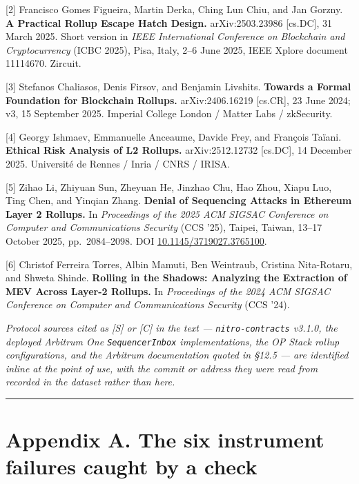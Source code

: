 \documentclass[conference]{IEEEtran}
\renewcommand{\_}{\textunderscore\allowbreak}
\begin{document}
{[}2{]} Francisco Gomes Figueira, Martin Derka, Ching Lun Chiu, and Jan
Gorzny. \textbf{A Practical Rollup Escape Hatch Design.}
arXiv:2503.23986 {[}cs.DC{]}, 31 March 2025. Short version in \emph{IEEE
International Conference on Blockchain and Cryptocurrency} (ICBC 2025),
Pisa, Italy, 2--6 June 2025, IEEE Xplore document 11114670. Zircuit.

{[}3{]} Stefanos Chaliasos, Denis Firsov, and Benjamin Livshits.
\textbf{Towards a Formal Foundation for Blockchain Rollups.}
arXiv:2406.16219 {[}cs.CR{]}, 23 June 2024; v3, 15 September 2025.
Imperial College London / Matter Labs / zkSecurity.

{[}4{]} Georgy Ishmaev, Emmanuelle Anceaume, Davide Frey, and François
Taïani. \textbf{Ethical Risk Analysis of L2 Rollups.} arXiv:2512.12732
{[}cs.DC{]}, 14 December 2025. Université de Rennes / Inria / CNRS /
IRISA.

{[}5{]} Zihao Li, Zhiyuan Sun, Zheyuan He, Jinzhao Chu, Hao Zhou, Xiapu
Luo, Ting Chen, and Yinqian Zhang. \textbf{Denial of Sequencing Attacks
in Ethereum Layer 2 Rollups.} In \emph{Proceedings of the 2025 ACM
SIGSAC Conference on Computer and Communications Security} (CCS '25),
Taipei, Taiwan, 13--17 October 2025, pp.~2084--2098. DOI
\href{https://doi.org/10.1145/3719027.3765100}{10.1145/3719027.3765100}.

{[}6{]} Christof Ferreira Torres, Albin Mamuti, Ben Weintraub, Cristina
Nita-Rotaru, and Shweta Shinde. \textbf{Rolling in the Shadows:
Analyzing the Extraction of MEV Across Layer-2 Rollups.} In
\emph{Proceedings of the 2024 ACM SIGSAC Conference on Computer and
Communications Security} (CCS '24).

\emph{Protocol sources cited as {[}S{]} or {[}C{]} in the text ---
\texttt{nitro-contracts} v3.1.0, the deployed Arbitrum One
\texttt{SequencerInbox} implementations, the OP Stack rollup
configurations, and the Arbitrum documentation quoted in §12.5 --- are
identified inline at the point of use, with the commit or address they
were read from recorded in the dataset rather than here.}

\begin{center}\rule{0.5\linewidth}{0.5pt}\end{center}

\section{Appendix A. The six instrument failures caught by a
check}\label{appendix-a.-the-six-instrument-failures-caught-by-a-check}
\end{document}
